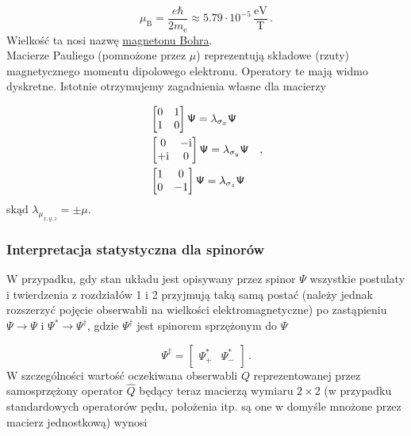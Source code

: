 \documentclass{myclass}
\begin{document}
\begin{equation*}
\mu_\text{B}=\frac{e\hbar}{2m_\text{e}}\approx 5.79\cdot10^{-5}\,\frac{\text{eV}}{\text{T}}\,.
\end{equation*}
Wielkość ta nosi nazwę \underline{magnetonu Bohra}.\\

Macierze Pauliego (pomnożone przez \(\mu\)) reprezentują składowe (rzuty) magnetycznego momentu
dipolowego elektronu. Operatory te mają widmo dyskretne. Istotnie otrzymujemy zagadnienia własne dla
macierzy

\begin{equation*}
\begin{split}
&\begin{bmatrix}
0 & 1\\
1 & 0
\end{bmatrix}\mathsf{\Psi}=\lambda_{\sigma_x}\mathsf{\Psi}\\
&\begin{bmatrix}
0 & -\mathrm{i}\\
+\mathrm{i} & 0
\end{bmatrix}\mathsf{\Psi}=\lambda_{\sigma_y}\mathsf{\Psi}\\
&\begin{bmatrix}
1 & 0\\
0 & -1
\end{bmatrix}\mathsf{\Psi}=\lambda_{\sigma_z}\mathsf{\Psi}
\end{split}\quad,
\end{equation*}
skąd \(\lambda_{\mu_{x,y,z}}=\pm \mu\).

\subsubsection{Interpretacja statystyczna dla spinorów}

W przypadku, gdy stan układu jest opisywany przez spinor \(\mathsf{\Psi}\) wszystkie postulaty i
twierdzenia z rozdziałów 1 i 2 przyjmują taką samą postać (należy jednak rozszerzyć pojęcie
obserwabli na wielkości elektromagnetyczne) po zastąpieniu \(\Psi\to\mathsf{\Psi}\) i
\(\Psi^*\to\mathsf{\Psi}^\dag\), gdzie \(\mathsf{\Psi}^\dag\) jest spinorem sprzężonym do
\(\mathsf{\Psi}\)

\begin{equation*}
\mathsf{\Psi}^\dag=\begin{bmatrix}
\Psi_+^* & \Psi_-^*
\end{bmatrix}\,.
\end{equation*}
W szczególności wartość oczekiwana obserwabli \(Q\) reprezentowanej przez samosprzężony operator
\(\hat{Q}\) będący teraz macierzą wymiaru \(2\times 2\) (w przypadku standardowych operatorów pędu,
położenia itp. są one w domyśle mnożone przez macierz jednostkową) wynosi
\end{document}

